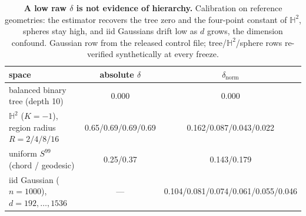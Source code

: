 \begin{table}[H]
\centering
\small
\begin{tabular}{lcc}
\toprule
space & absolute $\delta$ & $\delta_{\text{norm}}$ \\
\midrule
balanced binary tree (depth 10) & 0.000 & 0.000 \\
$\mathbb{H}^2$ ($K{=}-1$), region radius $R{=}2/4/8/16$ & 0.65/0.69/0.69/0.69 & 0.162/0.087/0.043/0.022 \\
uniform $S^{99}$ (chord / geodesic) & 0.25/0.37 & 0.143/0.179 \\
iid Gaussian ($n{=}1000$), $d{=}192,\dots,1536$ & --- & 0.104/0.081/0.074/0.061/0.055/0.046 \\
\bottomrule
\end{tabular}
\caption{\textbf{A low raw $\delta$ is not evidence of hierarchy.} Calibration on reference geometries: the estimator recovers the tree zero and the four-point constant of $\mathbb{H}^2$, spheres stay high, and iid Gaussians drift low as $d$ grows, the dimension confound. Gaussian row from the released control file; tree/$\mathbb{H}^2$/sphere rows re-verified synthetically at every freeze. %
}
\label{tab:calibration}
\end{table}
